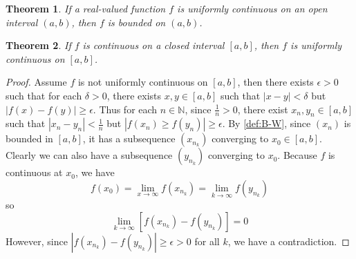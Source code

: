 \documentclass[12pt, lettersize]{book}
\theoremstyle{plain}
\newtheorem{thm}{Theorem}[section]
\theoremstyle{definition}
\theoremstyle{remark}
\newcommand{\N}{\mathbb{N}}
\begin{document}
			\begin{thm}
			If a real-valued function $f$ is uniformly continuous on an open interval $(a,b)$, then $f$ is \emph{bounded} on $(a,b)$.
			\end{thm}
			
			\begin{thm}\label{def:19.2}
			If $f$ is continuous on a closed interval $[a,b]$, then $f$ is uniformly continuous on $[a,b]$.
			\end{thm}
			\begin{proof}
			Assume $f$ is not uniformly continuous on $[a,b]$, then there exists $\epsilon>0$ such that for each $\delta>0$,
			there exists $x,y\in[a,b]$ such that $|x-y|<\delta$ but $|f(x)-f(y)|\geq\epsilon$. Thus for each $n\in\N$, since
			$\frac{1}{n}>0$, there exist $x_n,y_n\in[a,b]$ such that $|x_n-y_n|<\frac{1}{n}$ but $|f(x_n)\geq f(y_n)|\geq\epsilon$. By \ref{def:B-W}, since $(x_n)$ is bounded in $[a,b]$, it has a subsequence $(x_{n_k})$
			converging to $x_0\in[a,b]$. Clearly we can also have a subsequence $(y_{n_k})$ converging to $x_0$. Because $f$
			is continuous at $x_0$, we have 
			\begin{displaymath}
				f(x_0)=\lim\limits_{x\rightarrow\infty}f(x_{n_k})=\lim_{k\rightarrow\infty}f(y_{n_k})
			\end{displaymath}
			so
			\begin{displaymath}
				\lim_{k\rightarrow\infty}[f(x_{n_k})-f(y_{n_k})]=0
			\end{displaymath} 
			However, since $|f(x_{n_k})-f(y_{n_k})|\geq\epsilon>0$ for all $k$, we have a contradiction.
			\end{proof}
			
\end{document}
